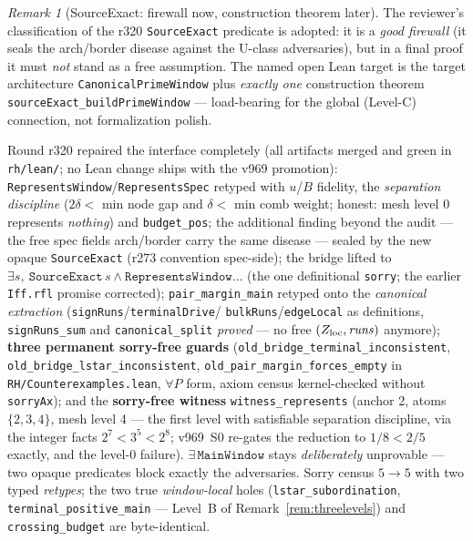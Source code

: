 \documentclass[11pt]{article}
\theoremstyle{definition}
\theoremstyle{remark}
\newtheorem{remark}[theorem]{Remark}
\begin{document}
\begin{remark}[SourceExact: firewall now, construction theorem
later]\label{rem:sourceexact-target}
The reviewer's classification of the r320 \texttt{SourceExact}
predicate is adopted: it is a \emph{good firewall} (it seals the
arch/border disease against the U-class adversaries), but in a final
proof it must \emph{not} stand as a free assumption.  The named open
Lean target is the target architecture
\texttt{CanonicalPrimeWindow} plus \emph{exactly one} construction
theorem \texttt{sourceExact\_buildPrimeWindow} --- load-bearing for
the global (Level-C) connection, not formalization polish.
\end{remark}

Round r320 repaired the interface completely (all artifacts merged
and green in \texttt{rh/lean/}; no Lean change ships with the v969
promotion): \texttt{RepresentsWindow}/\texttt{RepresentsSpec}
retyped with $u$/$B$ fidelity, the \emph{separation discipline}
($2\delta < $ min node gap and $\delta < $ min comb weight; honest:
mesh level 0 represents \emph{nothing}) and \texttt{budget\_pos};
the additional finding beyond the audit --- the free spec fields
arch/border carry the same disease --- sealed by the new opaque
\texttt{SourceExact} (r273 convention spec-side); the bridge lifted
to $\exists s,\ \texttt{SourceExact}\,s \wedge
\texttt{RepresentsWindow}\dots$ (the one definitional \texttt{sorry};
the earlier \texttt{Iff.rfl} promise corrected);
\texttt{pair\_margin\_main} retyped onto the \emph{canonical
extraction} (\texttt{signRuns}/\texttt{terminalDrive}/%
\texttt{bulkRuns}/\texttt{edgeLocal} as definitions,
\texttt{signRuns\_sum} and \texttt{canonical\_split} \emph{proved}
--- no free $(Z_{\rm loc}, \mathit{runs})$ anymore); \textbf{three
permanent sorry-free guards}
(\texttt{old\_bridge\_terminal\_inconsistent},
\texttt{old\_bridge\_lstar\_inconsistent},
\texttt{old\_pair\_margin\_forces\_empty} in
\texttt{RH/Counterexamples.lean}, $\forall P$ form, axiom census
kernel-checked without \texttt{sorryAx}); and the \textbf{sorry-free
witness} \texttt{witness\_represents} (anchor 2, atoms $\{2,3,4\}$,
mesh level 4 --- the first level with satisfiable separation
discipline, via the integer facts $2^7 < 3^5 < 2^8$; v969~S0
re-gates the reduction to $1/8 < 2/5$ exactly, and the level-0
failure).  $\exists\,\texttt{MainWindow}$ stays \emph{deliberately}
unprovable --- two opaque predicates block exactly the adversaries.
Sorry census $5 \to 5$ with two typed \emph{retypes}; the two true
\emph{window-local} holes (\texttt{lstar\_subordination},
\texttt{terminal\_positive\_main} --- Level~B of
Remark~\ref{rem:threelevels}) and \texttt{crossing\_budget}
are byte-identical.
\end{document}
